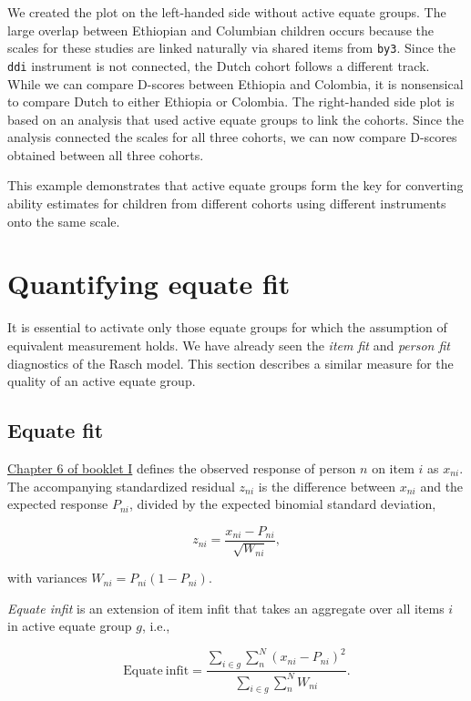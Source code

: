 \documentclass[
]{book}
\begin{document}
We created the plot on the left-handed side without active equate groups. The large overlap between Ethiopian and Columbian children occurs because the scales for these studies are linked naturally via shared items from \texttt{by3}. Since the \texttt{ddi} instrument is not connected, the Dutch cohort follows a different track. While we can compare D-scores between Ethiopia and Colombia, it is nonsensical to compare Dutch to either Ethiopia or Colombia. The right-handed side plot is based on an analysis that used active equate groups to link the cohorts. Since the analysis connected the scales for all three cohorts, we can now compare D-scores obtained between all three cohorts.

This example demonstrates that active equate groups form the key for converting ability estimates for children from different cohorts using different instruments onto the same scale.

\hypertarget{sec:equatefit}{%
\section{Quantifying equate fit}\label{sec:equatefit}}

It is essential to activate only those equate groups for which the assumption of equivalent measurement holds. We have already seen the \emph{item fit} and \emph{person fit} diagnostics of the Rasch model. This section describes a similar measure for the quality of an active equate group.

\hypertarget{equate-fit}{%
\subsection{Equate fit}\label{equate-fit}}

\href{https://d-score.org/dbook1/ch-evaluation.html}{Chapter 6 of booklet I} defines the observed response of person \(n\) on item \(i\) as \(x_{ni}\). The accompanying standardized residual \(z_{ni}\) is the difference between \(x_{ni}\) and the expected response \(P_{ni}\), divided by the expected binomial standard deviation,

\[z_{ni} = \frac{x_{ni}-P_{ni}}{\sqrt{W_{ni}}},\]

with variances \(W_{ni} = P_{ni}(1-P_{ni})\).

\emph{Equate infit} is an extension of item infit that takes an aggregate over all items \(i\) in active equate group \(g\), i.e.,

\[\mathrm{Equate\ infit} = \frac{\sum_{i\in g}\sum_{n}^N (x_{ni}-P_{ni})^2}{\sum_{i\in g}\sum_n^N W_{ni}}.\]
\end{document}
